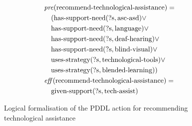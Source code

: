 \begin{figure}[t]
  \small  %
  \begin{align*}
  &\mathit{pre}(\text{recommend-technological-assistance}) = \\
  &\quad (\text{has-support-need}(\text{?s}, \text{asc-asd}) \lor \\
  &\quad \text{has-support-need}(\text{?s}, \text{language}) \lor \\
  &\quad \text{has-support-need}(\text{?s}, \text{deaf-hearing}) \lor \\
  &\quad \text{has-support-need}(\text{?s}, \text{blind-visual}) \lor \\
  &\quad \text{uses-strategy}(\text{?s}, \text{technological-tools}) \lor \\
  &\quad \text{uses-strategy}(\text{?s}, \text{blended-learning})) \\
  &\mathit{eff}(\text{recommend-technological-assistance}) = \\
  &\quad \text{given-support}(\text{?s}, \text{tech-assist})
  \end{align*}
  \caption{Logical formalisation of the PDDL action for recommending technological assistance}\label{fig:tech-assist}
\end{figure}